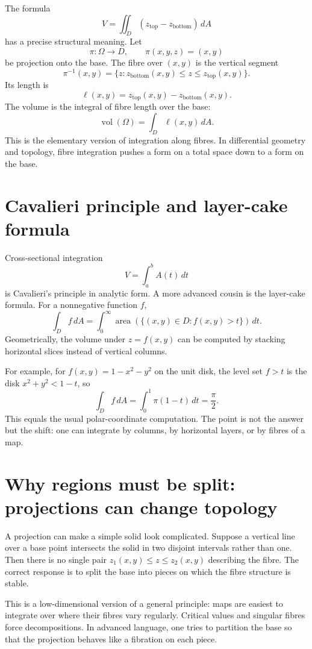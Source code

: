 The formula
\[
  V=\iint_D(z_{\mathrm{top}}-z_{\mathrm{bottom}})\,dA
\]
has a precise structural meaning.  Let
\[
  \pi:\Omega\to D,\qquad \pi(x,y,z)=(x,y)
\]
be projection onto the base.  The fibre over \((x,y)\) is the vertical segment
\[
  \pi^{-1}(x,y)=\{z:z_{\mathrm{bottom}}(x,y)\le z\le z_{\mathrm{top}}(x,y)\}.
\]
Its length is
\[
  \ell(x,y)=z_{\mathrm{top}}(x,y)-z_{\mathrm{bottom}}(x,y).
\]
The volume is the integral of fibre length over the base:
\[
  \operatorname{vol}(\Omega)=\int_D \ell(x,y)\,dA.
\]
This is the elementary version of integration along fibres.  In differential geometry and topology, fibre integration pushes a form on a total space down to a form on the base.

\section{Cavalieri principle and layer-cake formula}

Cross-sectional integration
\[
  V=\int_a^b A(t)\,dt
\]
is Cavalieri's principle in analytic form.  A more advanced cousin is the layer-cake formula.  For a nonnegative function \(f\),
\[
  \int_D f\,dA=\int_0^\infty \operatorname{area}(\{(x,y)\in D:f(x,y)>t\})\,dt.
\]
Geometrically, the volume under \(z=f(x,y)\) can be computed by stacking horizontal slices instead of vertical columns.

For example, for \(f(x,y)=1-x^2-y^2\) on the unit disk, the level set \(f>t\) is the disk \(x^2+y^2<1-t\), so
\[
  \int_D f\,dA=\int_0^1 \pi(1-t)\,dt=\frac{\pi}{2}.
\]
This equals the usual polar-coordinate computation.  The point is not the answer but the shift: one can integrate by columns, by horizontal layers, or by fibres of a map.

\section{Why regions must be split: projections can change topology}

A projection can make a simple solid look complicated.  Suppose a vertical line over a base point intersects the solid in two disjoint intervals rather than one.  Then there is no single pair \(z_1(x,y)\le z\le z_2(x,y)\) describing the fibre.  The correct response is to split the base into pieces on which the fibre structure is stable.

This is a low-dimensional version of a general principle: maps are easiest to integrate over where their fibres vary regularly.  Critical values and singular fibres force decompositions.  In advanced language, one tries to partition the base so that the projection behaves like a fibration on each piece.


